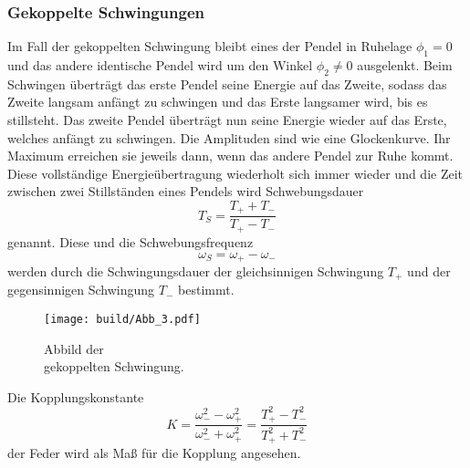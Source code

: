 \subsubsection{Gekoppelte Schwingungen}
\label{subsec:Gekoppelt}
\begin{minipage}[t]{0.5\textwidth}
Im Fall der gekoppelten Schwingung bleibt eines der Pendel in Ruhelage $\phi_1=0$ und das andere identische Pendel wird um den Winkel $\phi_2 \neq 0$ ausgelenkt.
Beim Schwingen überträgt das erste Pendel seine Energie auf das Zweite, sodass das Zweite langsam anfängt zu schwingen und das Erste langsamer wird, bis es stillsteht.
Das zweite Pendel überträgt nun seine Energie wieder auf das Erste, welches anfängt zu schwingen.
Die Amplituden sind wie eine Glockenkurve. 
Ihr Maximum erreichen sie jeweils dann, wenn das andere Pendel zur Ruhe kommt.
Diese vollständige Energieübertragung wiederholt sich immer wieder und die Zeit zwischen zwei Stillständen eines Pendels wird Schwebungsdauer 
\begin{equation}
    T_S=\frac{T_+ + T_-}{T_+-T_-}
    \label{eqn:TS}
\end{equation}
genannt. Diese und die Schwebungsfrequenz
\begin{equation}
    \omega_S = \omega_+ - \omega_-
    \label{eqn:omegaS}
\end{equation}
werden durch die Schwingungsdauer der gleichsinnigen Schwingung $T_+$ und der gegensinnigen Schwingung $T_-$ bestimmt.

\end{minipage}
\begin{minipage}[t]{0.5\textwidth}
    \begin{figure}[H]
        \centering
        \texttt{[image: build/Abb\_3.pdf]}
        \caption{Abbild der \\gekoppelten Schwingung. \cite{V106}}
        \label{fig:gekoppelt}
      \end{figure}
\end{minipage}

Die Kopplungskonstante
\begin{equation}
    K = \frac{\omega_-^2 -\omega_+^2}{\omega_-^2 + \omega_+^2} = \frac{T_+^2 - T_-^2}{T_+^2 + T_-^2}
    \label{eqn:K}
\end{equation}
der Feder wird als Maß für die Kopplung angesehen.

